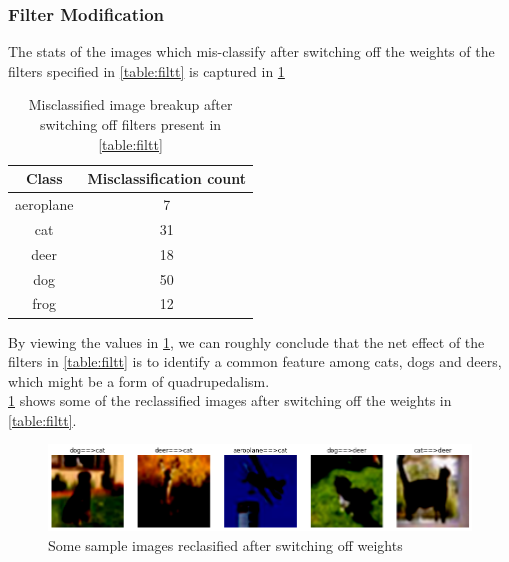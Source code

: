 \documentclass{article}
\begin{document}
\subsubsection{Filter Modification}
The stats of the images which mis-classify after switching off the weights of the filters specified in \cref{table:filtt} is captured in \cref{table:miscimgs}\\
\begin{table}[h!]
	\caption{Misclassified image breakup after switching off filters present in \cref{table:filtt}}
	\centering
	\begin{tabular}{|c | c|}
		\hline\hline
		Class & Misclassification count \\ [0.5ex]
		\hline
		 aeroplane & 7 \\
		       cat & 31 \\
		      deer & 18 \\
		       dog & 50 \\
			  frog & 12 \\ [1ex]
		\hline
	\end{tabular}
	\label{table:miscimgs}
\end{table}
By viewing the values in \cref{table:miscimgs}, we can roughly conclude that the net effect of the filters in \cref{table:filtt} is to identify a common feature among cats, dogs and deers, which might be a form of quadrupedalism.\\
\cref{fig:reclfgimgs} shows some of the reclassified images after switching off the weights in \cref{table:filtt}.
\begin{figure}[ht]
	\centering
	\includegraphics[scale=0.5]{../code/images/misclassified_switchoff.png}
	\caption{Some sample images reclasified after switching off weights}
	\label{fig:reclfgimgs}
\end{figure}
\end{document}
